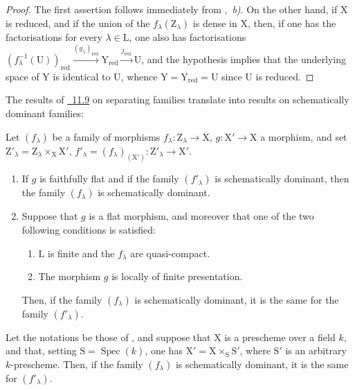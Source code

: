 \begin{proof}
The first assertion follows immediately from ,~\emph{b)}.
On the other hand, if $\mathrm{X}$ is reduced, and if the union of the $f_\lambda(\mathrm{Z}_\lambda)$ is dense in $\mathrm{X}$, then, if one has the factorisations  for every $\lambda\in\mathrm{L}$, one also has factorisations $(f_\lambda^{-1}(\mathrm{U}))_\mathrm{red}\xrightarrow{(g_\lambda)_\mathrm{red}}\mathrm{Y}_\mathrm{red}\xrightarrow{j_\mathrm{red}}\mathrm{U}$, and the hypothesis implies that the underlying space of $\mathrm{Y}$ is identical to $\mathrm{U}$, whence $\mathrm{Y}=\mathrm{Y}_\mathrm{red}=\mathrm{U}$ since $\mathrm{U}$ is reduced.
\end{proof}

The results of {\hyperref[subsection:IV.11.9]{\textsection~11.9}} on separating families translate into results on schematically dominant families:

\begin{theorem}[11.10.5]
\label{IV.11.10.5}
Let $(f_\lambda)$ be a family of morphisms $f_\lambda:\mathrm{Z}_\lambda\to\mathrm{X}$, $g:\mathrm{X}'\to\mathrm{X}$ a morphism, and set $\mathrm{Z}'_\lambda=\mathrm{Z}_\lambda\times_\mathrm{X}\mathrm{X}'$, $f'_\lambda=(f_\lambda)_{(\mathrm{X}')}:\mathrm{Z}'_\lambda\to\mathrm{X}'$.
\begin{enumerate}[label=\textup{(\roman*)}]
  \item If $g$ is faithfully flat and if the family $(f'_\lambda)$ is schematically dominant, then the family $(f_\lambda)$ is schematically dominant.
  \item Suppose that $g$ is a flat morphism, and moreover that \textup{one} of the two following conditions is satisfied:
  \begin{enumerate}[label=\emph{\alph*)}]
    \item $\mathrm{L}$ is finite and the $f_\lambda$ are quasi-compact.
    \item The morphism $g$ is locally of finite presentation.
  \end{enumerate}
  Then, if the family $(f_\lambda)$ is schematically dominant, it is the same for the family $(f'_\lambda)$.
\end{enumerate}
\end{theorem}

\begin{proposition}[11.10.6]
\label{IV.11.10.6}
Let the notations be those of , and suppose that $\mathrm{X}$ is a prescheme over a field $k$, and that, setting $\mathrm{S}=\operatorname{Spec}(k)$, one has $\mathrm{X}'=\mathrm{X}\times_\mathrm{S}\mathrm{S}'$, where $\mathrm{S}'$ is an arbitrary $k$-prescheme.
Then, if the family $(f_\lambda)$ is schematically dominant, it is the same for $(f'_\lambda)$.
\end{proposition}


